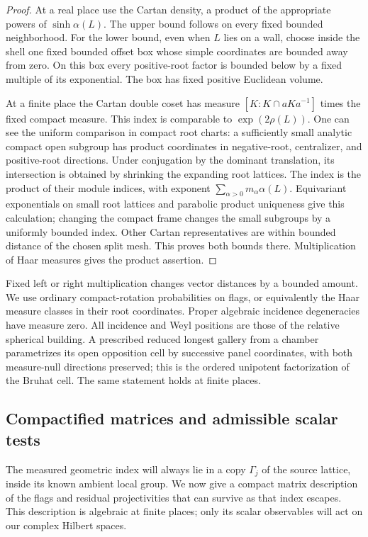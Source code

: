 \begin{proof}
At a real place use the Cartan density, a product of the appropriate
powers of $\sinh\alpha(L)$.  The upper bound follows on every fixed
bounded neighborhood.  For the lower bound, even when $L$ lies on a
wall, choose inside the shell one fixed bounded offset box whose
simple coordinates are bounded away from zero.  On this box every
positive-root factor is bounded below by a fixed multiple of its
exponential.  The box has fixed positive Euclidean volume.

At a finite place the Cartan double coset has measure
$[K:K\cap aKa^{-1}]$ times the fixed compact measure.  This index is
comparable to $\exp(2\rho(L))$.  One can see the uniform comparison
in compact root charts: a sufficiently small analytic compact open
subgroup has product coordinates in negative-root, centralizer, and
positive-root directions.  Under conjugation by the dominant
translation, its intersection is obtained by shrinking the expanding
root lattices.  The index is the product of their module indices,
with exponent $\sum_{\alpha>0}m_\alpha\alpha(L)$.  Equivariant
exponentials on small root lattices and parabolic product uniqueness
give this calculation; changing the compact frame changes the small
subgroups by a uniformly bounded index.  Other Cartan representatives
are within bounded distance of the chosen split mesh.  This proves
both bounds there.  Multiplication of Haar measures gives the product
assertion.
\end{proof}

Fixed left or right multiplication changes vector distances by a
bounded amount.  We use ordinary compact-rotation probabilities on
flags, or equivalently the Haar measure classes in their root
coordinates.  Proper algebraic incidence degeneracies have measure
zero.  All incidence and Weyl positions are those of the relative
spherical building.  A prescribed reduced longest gallery from a
chamber parametrizes its open opposition cell by successive panel
coordinates, with both measure-null directions preserved; this is
the ordered unipotent factorization of the Bruhat cell.  The same
statement holds at finite places.


\subsection{Compactified matrices and admissible scalar tests}

The measured geometric index will always lie in a copy $\Gamma_j$ of
the source lattice, inside its known ambient local group. We now give
a compact matrix description of the flags and residual projectivities
that can survive as that index escapes. This description is algebraic
at finite places; only its scalar observables will act on our complex
Hilbert spaces.


